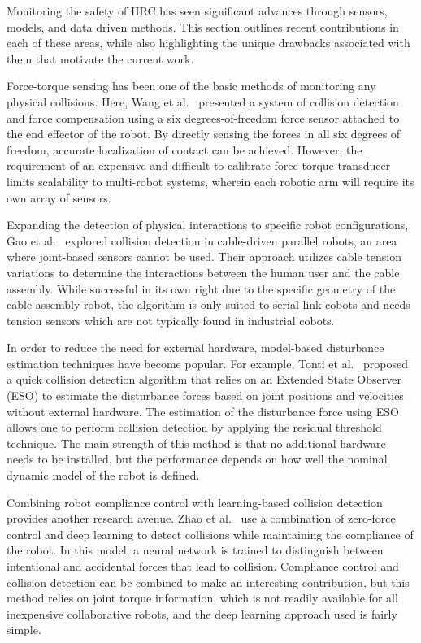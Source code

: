 \documentclass[3p,times,procedia]{elsarticle}
\begin{document}
Monitoring the safety of HRC has seen significant advances through sensors, models, and data driven methods. This section outlines recent contributions in each of these areas, while also highlighting the unique drawbacks associated with them that motivate the current work.

Force-torque sensing has been one of the basic methods of monitoring any physical collisions. Here, Wang et al.~\cite{wang2025sixdof} presented a system of collision detection and force compensation using a six degrees-of-freedom force sensor attached to the end effector of the robot. By directly sensing the forces in all six degrees of freedom, accurate localization of contact can be achieved. However, the requirement of an expensive and difficult-to-calibrate force-torque transducer limits scalability to multi-robot systems, wherein each robotic arm will require its own array of sensors.

Expanding the detection of physical interactions to specific robot configurations, Gao et al.~\cite{gao2024cable} explored collision detection in cable-driven parallel robots, an area where joint-based sensors cannot be used. Their approach utilizes cable tension variations to determine the interactions between the human user and the cable assembly. While successful in its own right due to the specific geometry of the cable assembly robot, the algorithm is only suited to serial-link cobots and needs tension sensors which are not typically found in industrial cobots.

In order to reduce the need for external hardware, model-based disturbance estimation techniques have become popular. For example, Tonti et al.~\cite{tonti2024eso} proposed a quick collision detection algorithm that relies on an Extended State Observer (ESO) to estimate the disturbance forces based on joint positions and velocities without external hardware. The estimation of the disturbance force using ESO allows one to perform collision detection by applying the residual threshold technique. The main strength of this method is that no additional hardware needs to be installed, but the performance depends on how well the nominal dynamic model of the robot is defined.

Combining robot compliance control with learning-based collision detection provides another research avenue. Zhao et al.~\cite{zhao2025zeroforce} use a combination of zero-force control and deep learning to detect collisions while maintaining the compliance of the robot. In this model, a neural network is trained to distinguish between intentional and accidental forces that lead to collision. Compliance control and collision detection can be combined to make an interesting contribution, but this method relies on joint torque information, which is not readily available for all inexpensive collaborative robots, and the deep learning approach used is fairly simple.
\end{document}
